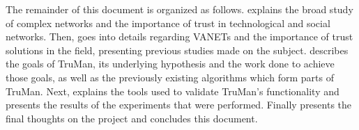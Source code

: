 The remainder of this document is organized as follows.  explains the broad study of complex networks and the importance of trust in technological and social networks.
Then,  goes into details regarding VANETs and the importance of trust solutions in the field, presenting previous studies made on the subject.
 describes the goals of TruMan, its underlying hypothesis and the work done to achieve those goals, as well as the previously existing algorithms which form parts of TruMan.
Next,  explains the tools used to validate TruMan's functionality and presents the results of the experiments that were performed.
Finally  presents the final thoughts on the project and concludes this document.

